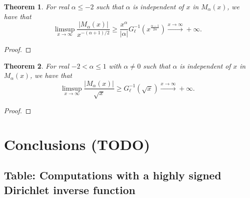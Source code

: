 \documentclass[11pt,reqno,a4letter]{article}
\numberwithin{figure}{section}
\numberwithin{table}{section}
\theoremstyle{plain}
\newtheorem{theorem}{Theorem}
\numberwithin{theorem}{section}
\theoremstyle{definition}
\begin{document}
\begin{theorem} 
For real $\alpha \leq -2$ such that $\alpha$ is independent of $x$ in $M_{\alpha}(x)$, 
we have that 
\[
\limsup\limits_{x \rightarrow \infty} \frac{|M_{\alpha}(x)|}{x^{-(\alpha+1)/2}} \geq 
     \frac{x^{\alpha}}{|\alpha|} G_{\ell}^{-1}\left(x^{\frac{\alpha-1}{2\alpha}}\right) 
     \xrightarrow{x \rightarrow \infty} +\infty. 
\]
\end{theorem}
\begin{proof} 
\end{proof} 

\begin{theorem} 
For real $-2 < \alpha \leq 1$ with $\alpha \neq 0$ 
such that $\alpha$ is independent of $x$ in $M_{\alpha}(x)$, we have that 
\[
\limsup\limits_{x \rightarrow \infty} \frac{|M_{\alpha}(x)|}{\sqrt{x}} \geq 
     G_{\ell}^{-1}\left(\sqrt{x}\right) 
     \xrightarrow{x \rightarrow \infty} +\infty. 
\]
\end{theorem}
\begin{proof} 
\end{proof} 

\newpage 
\section{Conclusions (TODO)} 

\newpage 
\renewcommand{\refname}{References} 
{}


\newpage
\renewcommand{\thesubsection}{T.\arabic{subsection}}
\subsection{Table: Computations with a highly signed Dirichlet inverse function} 
\label{table_conjecture_Mertens_ginvSeq_approx_values}
\end{document}
